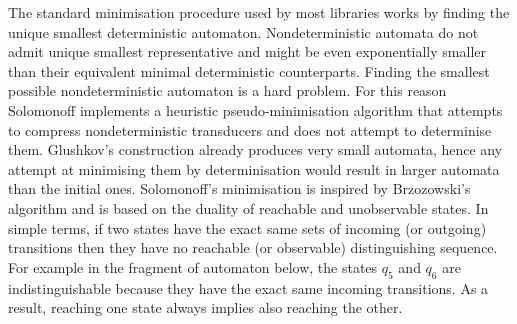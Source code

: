 The standard minimisation procedure used by most libraries works by finding the unique smallest deterministic automaton. Nondeterministic automata do not admit unique smallest representative and might be even exponentially smaller than their equivalent minimal deterministic counterparts. Finding the smallest possible nondeterministic automaton is a hard problem\cite{KAMEDA}. For this reason Solomonoff implements a heuristic pseudo-minimisation algorithm that attempts to compress nondeterministic transducers and does not attempt to determinise them. Glushkov's construction already produces very small automata, hence any attempt at minimising them by determinisation would result in larger automata than the initial ones. Solomonoff's minimisation is inspired by Brzozowski's algorithm \cite{brzozowski_co_algebraically} and is based on the duality of reachable and unobservable states. In simple terms, if two states have the exact same  sets of incoming (or outgoing) transitions then they have no reachable (or observable) distinguishing sequence. For example in the fragment of automaton below, the states $q_5$ and $q_6$ are indistinguishable because they have the exact same incoming transitions. As a result, reaching one state always implies also reaching the other.

